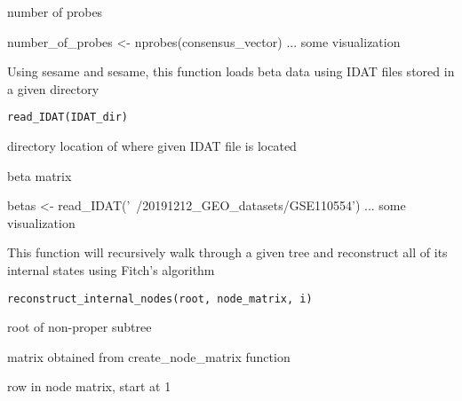 \documentclass[a4paper]{book}
\begin{document}
%
\begin{Value}
number of probes
\end{Value}
%
\begin{Examples}
\begin{ExampleCode}
number_of_probes <- nprobes(consensus_vector)
... some visualization 
\end{ExampleCode}
\end{Examples}
%
\begin{Description}\relax
Using sesame and sesame, this function loads beta data using IDAT files 
stored in a given directory
\end{Description}
%
\begin{Usage}
\begin{verbatim}
read_IDAT(IDAT_dir)
\end{verbatim}
\end{Usage}
%
\begin{Arguments}
\begin{ldescription}
\item[\code{IDAT\_dir}] directory location of where given IDAT file is located
\end{ldescription}
\end{Arguments}
%
\begin{Value}
beta matrix
\end{Value}
%
\begin{Examples}
\begin{ExampleCode}
betas <- read_IDAT('~/20191212_GEO_datasets/GSE110554')
... some visualization 
\end{ExampleCode}
\end{Examples}
%
\begin{Description}\relax
This function will recursively walk through a given tree and reconstruct 
all of its internal states using Fitch's algorithm
\end{Description}
%
\begin{Usage}
\begin{verbatim}
reconstruct_internal_nodes(root, node_matrix, i)
\end{verbatim}
\end{Usage}
%
\begin{Arguments}
\begin{ldescription}
\item[\code{root}] root of non-proper subtree

\item[\code{node\_matrix}] matrix obtained from create\_node\_matrix function

\item[\code{i}] row in node matrix, start at 1
\end{ldescription}
\end{Arguments}
\end{document}
